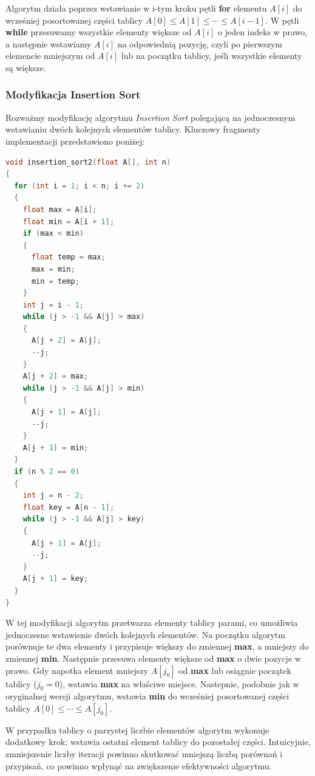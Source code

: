 \documentclass{article}
\begin{document}
Algorytm działa poprzez wstawianie w i-tym kroku pętli \textbf{for} elementu $A[i]$ do wcześniej posortowanej części tablicy $A[0] \leq A[1] \leq \cdots \leq A[i-1]$. W pętli \textbf{while} przesuwamy wszystkie elementy większe od $A[i]$ o jeden indeks w prawo, a następnie wstawiamy $A[i]$ na odpowiednią pozycję, czyli po pierwszym elemencie mniejszym od $A[i]$ lub na początku tablicy, jeśli wszystkie elementy są większe.
\subsubsection{Modyfikacja Insertion Sort}
Rozważmy modyfikację algorytmu \textit{Insertion Sort} polegającą na jednoczesnym wstawianiu dwóch kolejnych elementów tablicy. Kluczowy fragmenty implementacji przedstawiono poniżej:

\newpage

\begin{lstlisting}[style=mystyle, language=C++, caption={Implementacja Modyfikacji \texttt{Insertion Sort}}, label={lst:insertion2}]
void insertion_sort2(float A[], int n)
{
  for (int i = 1; i < n; i += 2)
  {
    float max = A[i];
    float min = A[i + 1];
    if (max < min)
    {
      float temp = max;
      max = min;
      min = temp;
    }
    int j = i - 1;
    while (j > -1 && A[j] > max)
    {
      A[j + 2] = A[j];
      --j;
    }
    A[j + 2] = max;
    while (j > -1 && A[j] > min)
    {
      A[j + 1] = A[j];
      --j;
    }
    A[j + 1] = min;
  }
  if (n % 2 == 0)
  {
    int j = n - 2;
    float key = A[n - 1];
    while (j > -1 && A[j] > key)
    {
      A[j + 1] = A[j];
      --j;
    }
    A[j + 1] = key;
  }
}
\end{lstlisting}
W tej modyfikacji algorytm przetwarza elementy tablicy parami, co umożliwia jednoczesne wstawienie dwóch kolejnych elementów. Na początku algorytm porównuje te dwa elementy i przypisuje większy do zmiennej \textbf{max}, a mniejszy do zmiennej \textbf{min}. Następnie przesuwa elementy większe od \textbf{max} o dwie pozycje w prawo. Gdy napotka element mniejszy $A[j_0]$ od \textbf{max} lub osiągnie początek tablicy ($j_0 = 0$), wstawia \textbf{max} na właściwe miejsce. Nastepnie, podobnie jak w oryginalnej wersji algorytmu, wstawia \textbf{min} do wcześniej posortowanej części tablicy $A[0] \leq \cdots \leq A[j_0]$.

W przypadku tablicy o parzystej liczbie elementów algorytm wykonuje dodatkowy krok: wstawia ostatni element tablicy do pozostałej części. Intuicyjnie, zmniejszenie liczby iteracji powinno skutkować mniejszą liczbą porównań i przypisań, co powinno wpłynąć na zwiększenie efektywności algorytmu.
\end{document}
